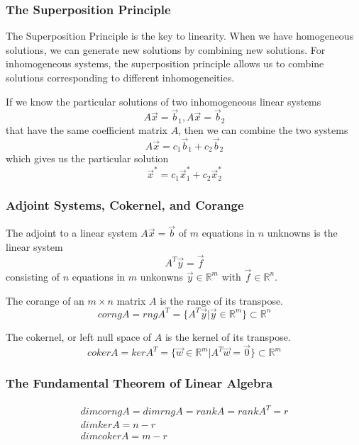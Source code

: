         \subsubsection{The Superposition Principle}
        The Superposition Principle is the key to linearity. When we have homogeneous solutions, we can generate new solutions by combining new solutions. For inhomogeneous systems, the superposition principle allows us to combine solutions corresponding to different inhomogeneities.

        If we know the particular solutions of two inhomogeneous linear systems
            \[ A \vec{x} = \vec{b}_1, A \vec{x} = \vec{b}_2 \]
        that have the same coefficient matrix $A$, then we can combine the two systems
            \[ A \vec{x} = c_1 \vec{b}_1 + c_2 \vec{b}_2 \]
        which gives us the particular solution
        \[ \vec{x}^* = c_1 \vec{x}^*_1 + c_2 \vec{x}^*_2 \]

        \subsubsection{Adjoint Systems, Cokernel, and Corange}
        The adjoint to a linear system $A \vec{x} = \vec{b}$ of $m$ equations in $n$ unknowns is the linear system
            \[ A^T \vec{y} = \vec{f} \]
        consisting of $n$ equations in $m$ unkonwns $\vec{y} \in \mathbb{R}^m$ with $\vec{f} \in \mathbb{R}^n$.

        The corange of an $m \times n$ matrix $A$ is the range of its transpose.
        \[ corng A = rng A^T = \{ A^T \vec{y} | \vec{y} \in \mathbb{R}^m \} \subset \mathbb{R}^n \]

        The cokernel, or left null space of $A$ is the kernel of its transpose.
        \[ coker A = ker A^T = \{ \vec{w} \in \mathbb{R}^m | A^T \vec{w} = \vec{0} \} \subset \mathbb{R}^m \]

        \subsubsection{The Fundamental Theorem of Linear Algebra}
        \[ \begin{aligned}
                dim corng A = dim rng A = rank A = rank A^T = r\\
                dim ker A = n - r\\
                dim coker A = m - r
        \end{aligned} \]
